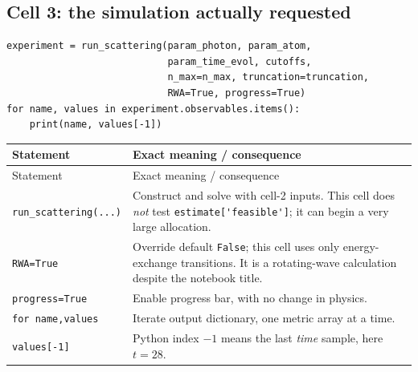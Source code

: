 \documentclass[11pt,a4paper]{article}
\newcommand{\code}[1]{\nolinkurl{#1}}
\begin{document}
\subsection{Cell 3: the simulation actually requested}
\begin{lstlisting}
experiment = run_scattering(param_photon, param_atom,
                            param_time_evol, cutoffs,
                            n_max=n_max, truncation=truncation,
                            RWA=True, progress=True)
for name, values in experiment.observables.items():
    print(name, values[-1])
\end{lstlisting}
\begin{longtable}{p{}p{}}
\toprule Statement & Exact meaning / consequence\\\midrule\endfirsthead
\toprule Statement & Exact meaning / consequence\\\midrule\endhead
\code{run_scattering(...)} & Construct and solve with cell-2 inputs. This cell does \emph{not} test \code{estimate['feasible']}; it can begin a very large allocation.\\
\code{RWA=True} & Override default \code{False}; this cell uses only energy-exchange transitions. It is a rotating-wave calculation despite the notebook title.\\
\code{progress=True} & Enable progress bar, with no change in physics.\\
\code{for name,values} & Iterate output dictionary, one metric array at a time.\\
\code{values[-1]} & Python index $-1$ means the last \emph{time} sample, here $t=28$.\\
\bottomrule
\end{longtable}
\end{document}
